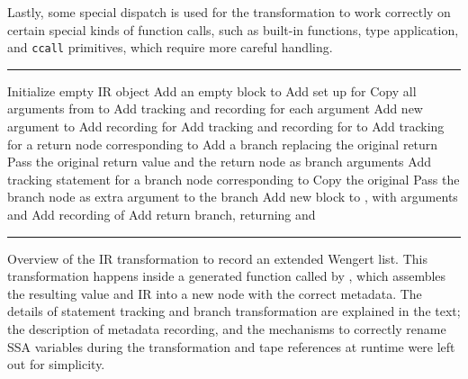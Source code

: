 Lastly, some special dispatch is used for the transformation to work correctly on certain special
kinds of function calls, such as built-in functions, type application, and \texttt{ccall}
primitives, which require more careful handling.

\begin{algorithm}[p]
  \footnotesize
  \hrule
  \smallskip
  \begin{algorithmic}
    \State Initialize empty IR object 
    \Statex
    \State Add an empty block  to 
    \State Add set up for 
    \EndIf
    \Statex
    \State Copy all arguments from  to 
    \State Add tracking and recording for each argument
    \Statex
    \State Add new argument  to 
    \State Add recording for 
    \EndIf
    \Statex
    \State Add tracking and recording for  to 
    \EndFor
    \Statex
    \State Add tracking for a return node corresponding to 
    \State Add a branch replacing the original return
    \State Pass the original return value and the return node as branch arguments
    \Else
    \State Add tracking statement for a branch node corresponding to 
    \State Copy the original 
    \State Pass the branch node as extra argument to the branch
    \EndIf
    \EndFor
    \EndFor
    \Statex
    \State Add new block to , with  arguments  and 
    \State Add recording of 
    \State Add return branch, returning  and 
    \EndProcedure
  \end{algorithmic}
  \smallskip
  \hrule
  \caption[IR transformation to record an extended Wengert list]{Overview of the IR transformation
    to record an extended Wengert list.  This transformation happens inside a generated function
    called by \protect{}, which assembles the resulting value and IR into a new node
    with the correct metadata.  The details of statement tracking and branch transformation are
    explained in the text; the description of metadata recording, and the mechanisms to correctly
    rename SSA variables during the transformation and tape references at runtime were left out for
    simplicity.\label{alg:ir-transform}}
\end{algorithm}

